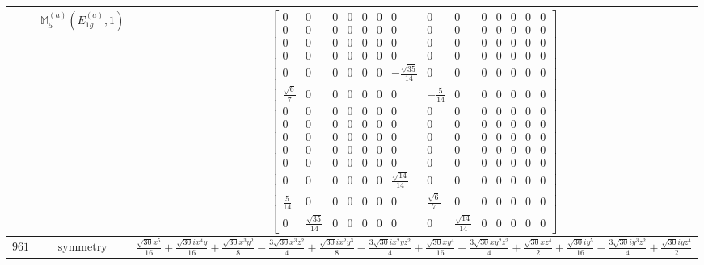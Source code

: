 \documentclass[fleqn,8pt,landscape]{jsarticle}
\begin{document}
\begin{longtable}{ccc}
$  $ & $ \mathbb{M}_{5}^{(a)}(E_{1g}^{(a)},1) $ & $ \begin{bmatrix} 0 & 0 & 0 & 0 & 0 & 0 & 0 & 0 & 0 & 0 & 0 & 0 & 0 & 0 \\ 0 & 0 & 0 & 0 & 0 & 0 & 0 & 0 & 0 & 0 & 0 & 0 & 0 & 0 \\ 0 & 0 & 0 & 0 & 0 & 0 & 0 & 0 & 0 & 0 & 0 & 0 & 0 & 0 \\ 0 & 0 & 0 & 0 & 0 & 0 & 0 & 0 & 0 & 0 & 0 & 0 & 0 & 0 \\ 0 & 0 & 0 & 0 & 0 & 0 & - \frac{\sqrt{35}}{14} & 0 & 0 & 0 & 0 & 0 & 0 & 0 \\ \frac{\sqrt{6}}{7} & 0 & 0 & 0 & 0 & 0 & 0 & - \frac{5}{14} & 0 & 0 & 0 & 0 & 0 & 0 \\ 0 & 0 & 0 & 0 & 0 & 0 & 0 & 0 & 0 & 0 & 0 & 0 & 0 & 0 \\ 0 & 0 & 0 & 0 & 0 & 0 & 0 & 0 & 0 & 0 & 0 & 0 & 0 & 0 \\ 0 & 0 & 0 & 0 & 0 & 0 & 0 & 0 & 0 & 0 & 0 & 0 & 0 & 0 \\ 0 & 0 & 0 & 0 & 0 & 0 & 0 & 0 & 0 & 0 & 0 & 0 & 0 & 0 \\ 0 & 0 & 0 & 0 & 0 & 0 & 0 & 0 & 0 & 0 & 0 & 0 & 0 & 0 \\ 0 & 0 & 0 & 0 & 0 & 0 & \frac{\sqrt{14}}{14} & 0 & 0 & 0 & 0 & 0 & 0 & 0 \\ \frac{5}{14} & 0 & 0 & 0 & 0 & 0 & 0 & \frac{\sqrt{6}}{7} & 0 & 0 & 0 & 0 & 0 & 0 \\ 0 & \frac{\sqrt{35}}{14} & 0 & 0 & 0 & 0 & 0 & 0 & \frac{\sqrt{14}}{14} & 0 & 0 & 0 & 0 & 0 \end{bmatrix} $ \\ \hline
$ 961 $ & $ \text{symmetry} $ & $ \frac{\sqrt{30} x^{5}}{16} + \frac{\sqrt{30} i x^{4} y}{16} + \frac{\sqrt{30} x^{3} y^{2}}{8} - \frac{3 \sqrt{30} x^{3} z^{2}}{4} + \frac{\sqrt{30} i x^{2} y^{3}}{8} - \frac{3 \sqrt{30} i x^{2} y z^{2}}{4} + \frac{\sqrt{30} x y^{4}}{16} - \frac{3 \sqrt{30} x y^{2} z^{2}}{4} + \frac{\sqrt{30} x z^{4}}{2} + \frac{\sqrt{30} i y^{5}}{16} - \frac{3 \sqrt{30} i y^{3} z^{2}}{4} + \frac{\sqrt{30} i y z^{4}}{2} $ \\

\end{longtable}
\end{document}
